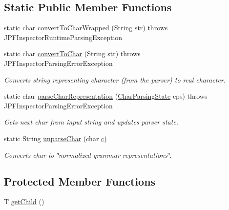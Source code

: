 \subsection*{Static Public Member Functions}
\begin{DoxyCompactItemize}
\item 
static char \hyperlink{classgov_1_1nasa_1_1jpf_1_1inspector_1_1server_1_1expression_1_1expressions_1_1_expression_state_value_const_char_ab0e26727c3893a7cb590ff9acd4bb839}{convert\+To\+Char\+Wrapped} (String str)  throws J\+P\+F\+Inspector\+Runtime\+Parsing\+Exception 
\item 
static char \hyperlink{classgov_1_1nasa_1_1jpf_1_1inspector_1_1server_1_1expression_1_1expressions_1_1_expression_state_value_const_char_ac78decd19d3fc825f1f429fcf5abc0fb}{convert\+To\+Char} (String str)  throws J\+P\+F\+Inspector\+Parsing\+Error\+Exception 
\begin{DoxyCompactList}\small\item\em Converts string representing character (from the parser) to real character. \end{DoxyCompactList}\item 
static char \hyperlink{classgov_1_1nasa_1_1jpf_1_1inspector_1_1server_1_1expression_1_1expressions_1_1_expression_state_value_const_char_a077c2e90a8ff79fba830fdb02af02c4f}{parse\+Char\+Representation} (\hyperlink{classgov_1_1nasa_1_1jpf_1_1inspector_1_1server_1_1expression_1_1expressions_1_1_expression_state3e52eea711d5518799170688e70a0d37}{Char\+Parsing\+State} cps)  throws J\+P\+F\+Inspector\+Parsing\+Error\+Exception 
\begin{DoxyCompactList}\small\item\em Gets next char from input string and updates parser state. \end{DoxyCompactList}\item 
static String \hyperlink{classgov_1_1nasa_1_1jpf_1_1inspector_1_1server_1_1expression_1_1expressions_1_1_expression_state_value_const_char_abf3e3448f33895c67aa9d48d8628710d}{unparse\+Char} (char \hyperlink{classgov_1_1nasa_1_1jpf_1_1inspector_1_1server_1_1expression_1_1expressions_1_1_expression_state_value_const_char_afa89583a44a250193efe6cb6ecbff9a0}{c})
\begin{DoxyCompactList}\small\item\em Converts char to \char`\"{}normalized grammar representations\char`\"{}. \end{DoxyCompactList}\end{DoxyCompactItemize}
\subsection*{Protected Member Functions}
\begin{DoxyCompactItemize}
\item 
T \hyperlink{classgov_1_1nasa_1_1jpf_1_1inspector_1_1server_1_1expression_1_1_expression_state_unary_operator_a150bac338d6557f79ca185d3f6ad6e06}{get\+Child} ()
\end{DoxyCompactItemize}
